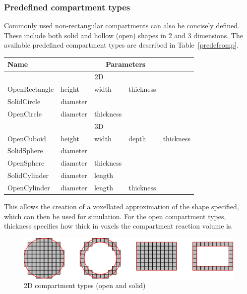 \documentclass[english]{report}
\begin{document}
\subsubsection{Predefined compartment types}

Commonly used non-rectangular compartments can also be concisely defined. These include both solid and hollow (open) shapes in 2 and 3 dimensions. The available predefined compartment types are described in Table~\ref{predefcomp}.

\begin{table}[h!]
\centering
{}
\begin{tabular}{|l|llll|}
\hline
Name & \multicolumn{4}{|c|}{Parameters}\\ 
\hline
\multicolumn{5}{|c|}{2D}\\
\hline
OpenRectangle & height & width & thickness & \\
SolidCircle & diameter &  &  & \\
OpenCircle & diameter & thickness &  & \\
\hline
\multicolumn{5}{|c|}{3D}\\
\hline
OpenCuboid & height & width & depth & thickness\\
SolidSphere & diameter &  &  &  \\
OpenSphere & diameter & thickness &  & \\
SolidCylinder & diameter & length & & \\
OpenCylinder & diameter & length & thickness & \\
\hline
\end{tabular} 
\end{table}


This allows the creation of a voxellated approximation of the shape specified, which can then be used for simulation. For the open compartment types, thickness specifies how thick in voxels the compartment reaction volume is.

\begin{figure}[h!]
 \centering
 \includegraphics[scale=0.27]{./images/compartmentTypes.png}
 \caption{2D compartment types (open and solid)}
 \label{fig:compartmentTypes}
\end{figure}
\end{document}
